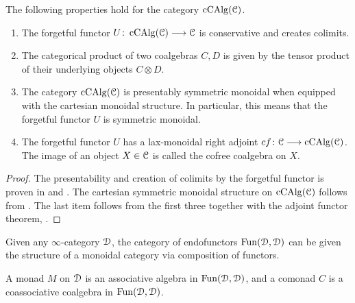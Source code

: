 \begin{proposition}
    The following properties hold for the category $\operatorname{cCAlg}(\EuScript{C})$. 
    \begin{enumerate}
        \item The forgetful functor $U\colon\operatorname{cCAlg}(\EuScript{C})\longrightarrow \EuScript{C}$ is conservative and creates colimits. \label{ch2:prop:properties-coalgebras:item1}
        \item The categorical product of two coalgebras $C, D$ is given by the tensor product of their underlying objects $C\otimes D$. \label{ch2:prop:properties-coalgebras:item2}
        \item The category $\operatorname{cCAlg}(\EuScript{C})$ is presentably symmetric monoidal when equipped with the cartesian monoidal structure. In particular, this means that the forgetful functor $U$ is symmetric monoidal. \label{ch2:prop:properties-coalgebras:item3}
        \item The forgetful functor $U$ has a lax-monoidal right adjoint $cf\colon\EuScript{C}\longrightarrow\operatorname{cCAlg}(\EuScript{C})$. The image of an object $X\in \EuScript{C}$ is called the cofree coalgebra on $X$. \label{ch2:prop:properties-coalgebras:item4}
    \end{enumerate}
\end{proposition}
\begin{proof}
    The presentability and creation of colimits by the forgetful functor is proven in \cite[3.1.2]{lurie_2018_ELL1} and \cite[3.1.4]{lurie_2018_ELL1}. The cartesian symmetric monoidal structure on $\operatorname{cCAlg}(\EuScript{C})$ follows from \cite[3.2.4.7]{Lurie_HA}. The last item follows from the first three together with the adjoint functor theorem, \cite[5.5.2.9]{lurie_09}. 
\end{proof}



Given any $\infty$-category $\EuScript{D}$, the category of endofunctors $\operatorname{Fun}(\EuScript{D}, \EuScript{D})$ can be given the structure of a monoidal category via composition of functors. 

\begin{definition}
    A monad $M$ on $\EuScript{D}$ is an associative algebra in $\operatorname{Fun}(\EuScript{D}, \EuScript{D})$, and a comonad $C$ is a coassociative coalgebra in $\operatorname{Fun}(\EuScript{D}, \EuScript{D})$. 
\end{definition}


